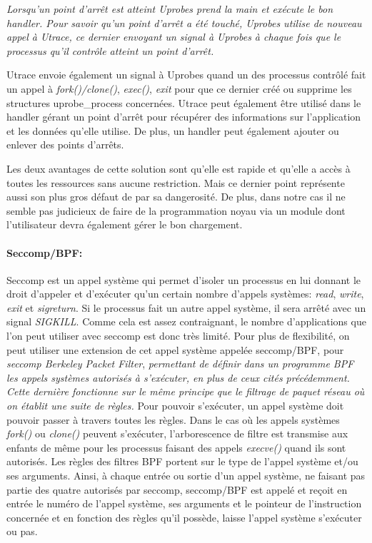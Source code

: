 \textit{Lorsqu'un point d'arrêt est atteint Uprobes prend la main et exécute le bon
handler. Pour savoir qu'un point d'arrêt a été touché, Uprobes utilise de
nouveau appel à Utrace, ce dernier envoyant un signal à Uprobes à chaque fois que le
processus qu'il contrôle atteint un point d'arrêt.}

Utrace envoie également un signal à Uprobes quand un des processus contrôlé fait
un appel à \textit{fork()/clone()}, \textit{exec()}, \textit{exit} pour que ce
dernier créé ou supprime les structures uprobe\_process concernées. Utrace peut
également être utilisé dans le handler gérant un point d'arrêt pour récupérer
des informations sur l'application et les données qu'elle utilise. De plus, un
handler peut également ajouter ou enlever des points d'arrêts.

Les deux avantages de cette solution sont qu'elle est rapide et qu'elle a accès
à toutes les ressources sans aucune restriction. Mais ce dernier point
représente aussi son plus gros défaut de par sa dangerosité. De plus, dans notre
cas il ne semble pas judicieux de faire de la programmation noyau via un module
dont l'utilisateur devra également gérer le bon chargement.

\paragraph{Seccomp/BPF:}

Seccomp \citet{seccompbpf} est un appel système qui permet d'isoler
un processus en lui donnant le droit d'appeler et d'exécuter qu'un certain
nombre d'appels systèmes: \textit{read}, \textit{write}, \textit{exit} et
\textit{sigreturn}. Si le processus fait un autre appel système, il sera arrêté
avec un signal \textit{SIGKILL}. Comme cela est assez contraignant, le nombre
d'applications que l'on peut utiliser avec seccomp est donc très limité. Pour
plus de flexibilité, on peut utiliser une extension de cet appel système appelée
seccomp/BPF, pour \textit{seccomp Berkeley Packet Filter}, \textit{permettant de
  définir dans un programme BPF \citet{bpf} les appels systèmes
  autorisés à s'exécuter, en plus de ceux cités précédemment. Cette dernière fonctionne sur le même principe que le
  filtrage de paquet réseau où on établit une suite de règles.} Pour pouvoir s'exécuter, un appel
système doit pouvoir passer à travers toutes les règles. Dans le cas où les
appels systèmes \textit{fork()} ou \textit{clone()} peuvent s'exécuter,
l'arborescence de filtre est transmise aux enfants de même pour les processus
faisant des appels \textit{execve()} quand ils sont autorisés. Les règles des
filtres BPF portent sur le type de l'appel système et/ou ses arguments. Ainsi, à
chaque entrée ou sortie d'un appel système, ne faisant pas partie des quatre
autorisés par seccomp, seccomp/BPF est appelé et reçoit en entrée le numéro de
l'appel système, ses arguments et le pointeur de l'instruction concernée et en
fonction des règles qu'il possède, laisse l'appel système s'exécuter ou pas.

